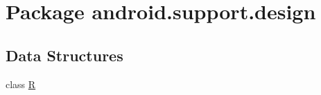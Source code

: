 \hypertarget{namespaceandroid_1_1support_1_1design}{}\section{Package android.\+support.\+design}
\label{namespaceandroid_1_1support_1_1design}
\subsection*{Data Structures}
\begin{DoxyCompactItemize}
\item 
class \mbox{\hyperlink{classandroid_1_1support_1_1design_1_1_r}{R}}
\end{DoxyCompactItemize}
